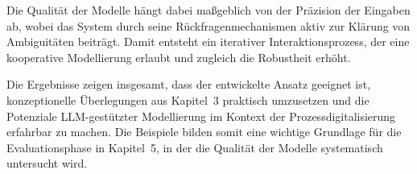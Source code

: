 \documentclass[a4paper,12pt]{scrreprt}
\begin{document}
Die Qualität der Modelle hängt dabei maßgeblich von der Präzision der Eingaben ab, wobei das System durch seine Rückfragenmechanismen aktiv zur Klärung von Ambiguitäten beiträgt. Damit entsteht ein iterativer Interaktionsprozess, der eine kooperative Modellierung erlaubt und zugleich die Robustheit erhöht. 

Die Ergebnisse zeigen insgesamt, dass der entwickelte Ansatz geeignet ist, konzeptionelle Überlegungen aus Kapitel~3 praktisch umzusetzen und die Potenziale LLM-gestützter Modellierung im Kontext der Prozessdigitalisierung erfahrbar zu machen. Die Beispiele bilden somit eine wichtige Grundlage für die Evaluationsphase in Kapitel~5, in der die Qualität der Modelle systematisch untersucht wird.

\newpage
\makeatletter
\renewcommand\@biblabel[1]{\textbf{[#1]}} %
\makeatother
\setlength{\bibhang}{1em}


\end{document}
